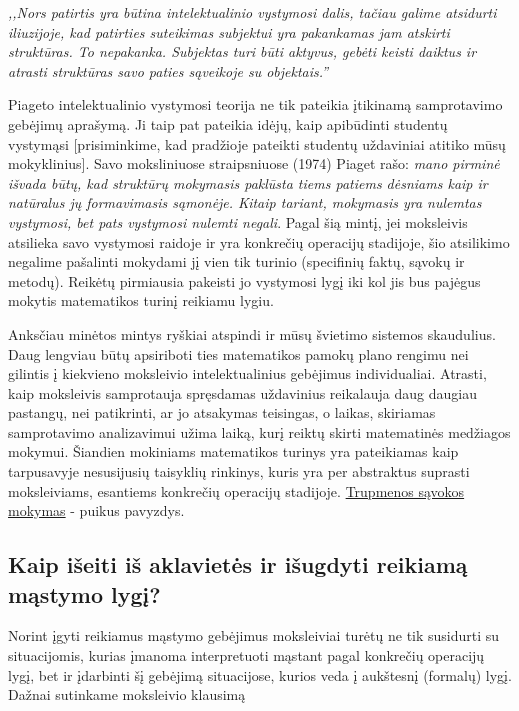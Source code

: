\documentclass{article}
\begin{document}
\textit{,,Nors patirtis yra būtina intelektualinio vystymosi dalis, tačiau galime atsidurti iliuzijoje, kad patirties suteikimas subjektui yra pakankamas jam atskirti struktūras. To nepakanka. Subjektas turi būti aktyvus, gebėti keisti daiktus ir atrasti struktūras savo paties sąveikoje su objektais.''}

Piageto intelektualinio vystymosi teorija ne tik pateikia įtikinamą samprotavimo gebėjimų aprašymą. Ji taip pat pateikia idėjų, kaip apibūdinti studentų vystymąsi [prisiminkime, kad pradžioje pateikti studentų uždaviniai atitiko mūsų mokyklinius]. Savo moksliniuose straipsniuose (1974) Piaget rašo: \textit{mano pirminė išvada būtų, kad struktūrų mokymasis paklūsta tiems patiems dėsniams kaip ir natūralus jų formavimasis sąmonėje. Kitaip tariant, mokymasis yra nulemtas vystymosi, bet pats vystymosi nulemti negali}. Pagal šią mintį, jei moksleivis atsilieka savo vystymosi raidoje ir yra konkrečių operacijų stadijoje, šio atsilikimo negalime pašalinti mokydami jį vien tik turinio (specifinių faktų, sąvokų ir metodų). Reikėtų pirmiausia pakeisti jo vystymosi lygį iki kol jis bus pajėgus mokytis matematikos turinį reikiamu lygiu. 

Anksčiau minėtos mintys ryškiai atspindi ir mūsų švietimo sistemos skaudulius. Daug lengviau būtų apsiriboti ties matematikos pamokų plano rengimu nei gilintis į kiekvieno moksleivio intelektualinius gebėjimus individualiai. Atrasti, kaip moksleivis samprotauja spręsdamas uždavinius reikalauja daug daugiau pastangų, nei patikrinti, ar jo atsakymas teisingas, o laikas, skiriamas samprotavimo analizavimui užima laiką, kurį reiktų skirti matematinės medžiagos mokymui. Šiandien mokiniams matematikos turinys yra pateikiamas kaip tarpusavyje nesusijusių taisyklių rinkinys, kuris yra per abstraktus suprasti moksleiviams, esantiems konkrečių operacijų stadijoje. \href{http://norvaisa.lt/matematika/mokykline-matematika/mokyklines-matematikos-turinys-trupmenos-savoka/}{Trupmenos sąvokos mokymas} - puikus pavyzdys. 

\subsection{Kaip išeiti iš aklavietės ir išugdyti reikiamą mąstymo lygį?}

Norint įgyti reikiamus mąstymo gebėjimus moksleiviai turėtų ne tik susidurti su situacijomis, kurias įmanoma interpretuoti mąstant pagal konkrečių operacijų lygį, bet ir įdarbinti šį gebėjimą situacijose, kurios veda į aukštesnį (formalų) lygį. Dažnai sutinkame moksleivio klausimą 
\end{document}
